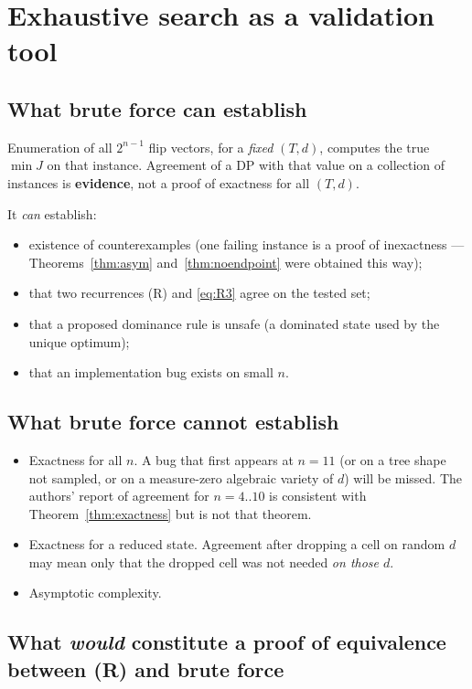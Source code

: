 \documentclass[11pt]{article}
\theoremstyle{plain}
\begin{document}
\section{Exhaustive search as a validation tool}

\subsection{What brute force can establish}

Enumeration of all \(2^{n-1}\) flip vectors, for a \emph{fixed} \((T,d)\),
computes the true \(\min J\) on that instance. Agreement of a DP with that value
on a collection of instances is \textbf{evidence}, not a proof of exactness for
all \((T,d)\).

It \emph{can} establish:

\begin{itemize}
\item existence of counterexamples (one failing instance is a proof of
  inexactness --- Theorems~\ref{thm:asym} and~\ref{thm:noendpoint} were obtained
  this way);
\item that two recurrences (R) and \eqref{eq:R3} agree on the tested set;
\item that a proposed dominance rule is unsafe (a dominated state used by the
  unique optimum);
\item that an implementation bug exists on small \(n\).
\end{itemize}

\subsection{What brute force cannot establish}

\begin{itemize}
\item Exactness for all \(n\). A bug that first appears at \(n = 11\) (or on a
  tree shape not sampled, or on a measure-zero algebraic variety of \(d\))
  will be missed. The authors' report of agreement for \(n = 4..10\) is
  consistent with Theorem~\ref{thm:exactness} but is not that theorem.
\item Exactness for a reduced state. Agreement after dropping a cell on random
  \(d\) may mean only that the dropped cell was not needed \emph{on those
  \(d\)}.
\item Asymptotic complexity.
\end{itemize}

\subsection{What \emph{would} constitute a proof of equivalence between (R) and
brute force}
\end{document}

